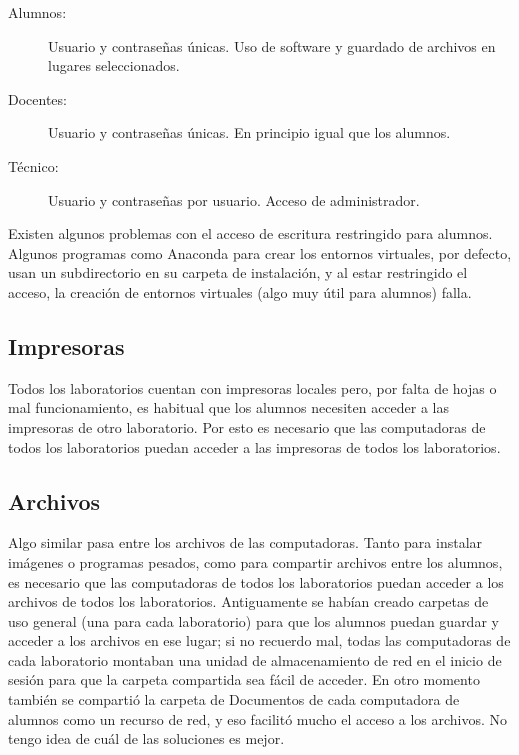 \begin{description}
    \item[Alumnos:] Usuario y contraseñas únicas. Uso de software y guardado de archivos en lugares seleccionados.
    \item[Docentes:] Usuario y contraseñas únicas. En principio igual que los alumnos.
    \item[Técnico:] Usuario y contraseñas por usuario. Acceso de administrador.
\end{description}

Existen algunos problemas con el acceso de escritura restringido para alumnos. Algunos programas como Anaconda para crear los entornos virtuales, por defecto, usan un subdirectorio en su carpeta de instalación, y al estar restringido el acceso, la creación de entornos virtuales (algo muy útil para alumnos) falla.

\subsection{Impresoras} 
Todos los laboratorios cuentan con impresoras locales pero, por falta de hojas o mal funcionamiento, es habitual que los alumnos necesiten acceder a las impresoras de otro laboratorio. Por esto es necesario que las computadoras de todos los laboratorios puedan acceder a las impresoras de todos los laboratorios.

\subsection{Archivos} 
Algo similar pasa entre los archivos de las computadoras. Tanto para instalar imágenes o programas pesados, como para compartir archivos entre los alumnos, es necesario que las computadoras de todos los laboratorios puedan acceder a los archivos de todos los laboratorios. Antiguamente se habían creado carpetas de uso general (una para cada laboratorio) para que los alumnos puedan guardar y acceder a los archivos en ese lugar; si no recuerdo mal, todas las computadoras de cada laboratorio montaban una unidad de almacenamiento de red en el inicio de sesión para que la carpeta compartida sea fácil de acceder. En otro momento también se compartió la carpeta de Documentos de cada computadora de alumnos como un recurso de red, y eso facilitó mucho el acceso a los archivos. No tengo idea de cuál de las soluciones es mejor. 
